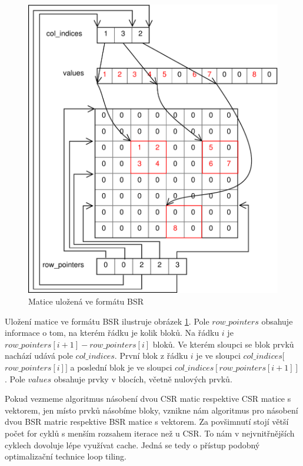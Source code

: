 \begin{figure}[htb]\centering
	\includegraphics[width=\textwidth]{./images/bsr/bsr}
	\caption{Matice uložená ve formátu BSR}
	\label{fig:BSR}
\end{figure}

Uložení matice ve formátu BSR ilustruje obrázek \ref{fig:BSR}. Pole $row\_pointers$ obsahuje informace o tom, na kterém řádku je kolik bloků. Na řádku $i$ je $row\_pointers[i+1] - row\_pointers[i]$ bloků. Ve kterém sloupci se blok prvků nachází udává pole $col\_indices$. První blok z řádku $i$ je ve sloupci $col\_indices[$ $row\_pointers[i]]$ a poslední blok je ve sloupci $col\_indices[ row\_pointers[i+1] ]$. Pole $values$ obsahuje prvky v blocích, včetně nulových prvků.

Pokud vezmeme algoritmus násobení dvou CSR matic respektive CSR matice s vektorem, jen místo prvků násobíme bloky, vznikne nám algoritmus pro násobení dvou BSR matric respektive BSR matice s vektorem. Za povšimnutí stojí větší počet for cyklů s menším rozsahem iterace než u CSR. To nám v nejvnitřnějších cyklech dovoluje lépe využívat cache. Jedná se tedy o přístup podobný optimalizační technice loop tiling\cite{Wolf:1991:DLO:113445.113449}.

